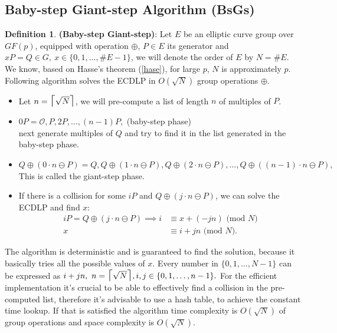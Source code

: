 \documentclass[thesis=M,english]{FITthesis}[2012/10/20]
\theoremstyle{remark}
\theoremstyle{definition}
\newtheorem{DF}{Definition}[section]
\begin{document}
\subsection{Baby-step Giant-step Algorithm (BsGs)}
\begin{DF}
\textbf{(Baby-step Giant-step)}: Let $E$ be an elliptic curve group over $GF(p)$, equipped with operation $\oplus$, $P \in E$ its generator and $xP = Q \in G,\ x \in \{0, 1, \ldots, \#E - 1\}$, we will denote the order of $E$ by $N = \#E$. We know, based on Hasse's theorem (\ref{hase}), for large $p$, $N$ is approximately $p$. Following algorithm solves the ECDLP in $O(\sqrt{N})$ group operations $\oplus$.
\begin{itemize}
\item Let $n = \mathlarger{\mathlarger{\mathlarger{\lceil}}} \sqrt{N} \mathlarger{\mathlarger{\mathlarger{\rceil}}}$, we will pre-compute a list of length $n$ of multiples of $P$.
\item $0P = \mathcal{O}, P, 2P, \ldots, (n-1)P,$ \hfill (baby-step phase) \\
next generate multiples of $Q$ and try to find it in the list generated in the baby-step phase.
\item $Q \oplus (0\cdot n \ominus P) = Q, Q \oplus (1\cdot n \ominus P), Q \oplus (2\cdot n \ominus P), \ldots, Q \oplus ((n-1)\cdot n \ominus P),$\\
This is called the giant-step phase.
\item If there is a collision for some $iP$ and $Q \oplus (j\cdot n \ominus P)$, we can solve the ECDLP and find $x$:
\begin{align*}
iP = Q \oplus (j\cdot n \ominus P) \implies i &\equiv x + (-jn) \text{ (mod $N$)} \\
x &\equiv i + jn \text{ (mod $N$)}.
\end{align*}
\end{itemize}
\noindent The algorithm is deterministic and is guaranteed to find the solution, because it basically tries all the possible values of $x$. Every number in $\{0, 1, \ldots, N - 1\}$ can be expressed as $i + jn,\ n = \mathlarger{\mathlarger{\mathlarger{\lceil}}} \sqrt{N} \mathlarger{\mathlarger{\mathlarger{\rceil}}},i,j \in \{0,1,\ldots, n-1\}.$ 
For the efficient implementation it's crucial to be able to effectively find a collision in the pre-computed list, therefore it's advisable to use a hash table, to achieve the constant time lookup. If that is satisfied the algorithm time complexity is $O(\sqrt{N})$ of group operations and space complexity is $O(\sqrt{N})$.
\end{DF}
\end{document}
